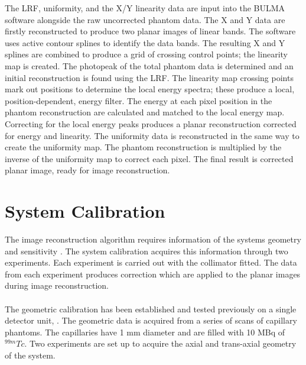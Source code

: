 The \acrshort{LRF}, uniformity, and the X/Y linearity data are input into the BULMA software alongside the raw uncorrected phantom data. The X and Y data are firstly reconstructed to produce two planar images of linear bands. The software uses active contour splines to identify the data bands. The resulting X and Y splines are combined to produce a grid of crossing control points; the linearity map is created. The photopeak of the total phantom data is determined and an initial reconstruction is found using the \acrshort{LRF}. The linearity map crossing points mark out positions to determine the local energy spectra; these produce a local, position-dependent, energy filter. The energy at each pixel position in the phantom reconstruction are calculated and matched to the local energy map. Correcting for the local energy peaks produces a planar reconstruction corrected for energy and linearity. The uniformity data is reconstructed in the same way to create the uniformity map. The phantom reconstruction is multiplied by the inverse of the uniformity map to correct each pixel. The final result is corrected planar image, ready for image reconstruction. 


\section{System Calibration}
The image reconstruction algorithm requires information of the systems geometry and sensitivity \cite{Beque2003CharacterizationGeometry}. The system calibration acquires this information through two experiments. Each experiment is carried out with the collimator fitted. The data from each experiment produces correction which are applied to the planar images during image reconstruction. 
 
 \paragraph{}
 
The geometric calibration has been established and tested previously on a single detector unit, \cite{8340862}. The geometric data is acquired from a series of scans of capillary phantoms. The capillaries have 1 mm diameter and are filled with 10 MBq of $^{99m}Tc$. Two experiments are set up to acquire the axial and trans-axial geometry of the system. 

